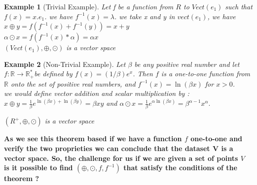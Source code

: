 \documentclass{report}
\newtheorem{Example}{Example}
\begin{document}
        \begin{Example}[Trivial Example]
            Let f be a function from $R$ to $Vect{(e_1)}$ such that $f(x) = x.e_1$.
            we have $f^{-1}(x) = \lambda$.
            we take x and y in $vect{(e_1)}$, we have \\
            $x\oplus y = f(f^{-1}(x) + f^{-1}(y)) = x + y$ \\
            $\alpha \odot x = f(f^{-1}(x) * \alpha) = \alpha x$ 
            \\
            $(Vect{(e_1)}, \oplus, \odot)$ is a vector space
        \end{Example}
        \begin{Example}[Non-Trivial Example]
            Let $\beta$ be any positive real number and let $f: \mathbb{R} \rightarrow \mathbb{R}_{+}^{*}$be
            defined by $f(x)=(1 / \beta) e^x$. Then $f$ is a one-to-one
            function from $\mathbb{R}$ onto the set of positive real numbers, 
            and $f^{-1}(x)=\ln (\beta x)$ for $x>0$. 
            \\
            we would define vector addition and scalar multiplication by :
            \\
            $
            x \oplus y=\frac{1}{\beta} e^{\ln (\beta x)+\ln (\beta y)}=\beta x y
            $
            and
            $
            \alpha \odot x=\frac{1}{\beta} e^{\alpha \ln (\beta x)}=\beta^{\alpha-1} x^\alpha.
            $

            $(R^+, \oplus, \odot)$ is a vector space 

        \end{Example}



        \textbf{As we see this theorem based if we have a function
        $f$ one-to-one and verify the two proprieties we can conclude that the dataset V is a vector space.
        So, the challenge for us if we are given a set of points $V$ is it  possible to 
        find $(\oplus,\odot,f,f^{-1})$ that satisfy the conditions of the theorem ?}
\end{document}
